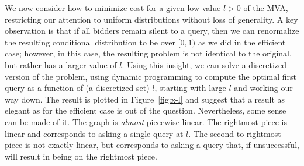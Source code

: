 We now consider how to minimize cost for a given low value $l>0$ of the
MVA, restricting our attention to uniform distributions without loss of
generality.  A key observation is that if all bidders remain silent to a
query, then we can renormalize the resulting conditional distribution to be
over $[0,1)$ as we did in the efficient case; however, in this case, the
resulting problem is not identical to the original, but rather has a larger
value of $l$.  Using this insight, we can solve a discretized version of
the problem, using dynamic programming to compute the optimal first query
as a function of (a discretized set) $l$, starting with large $l$ and
working our way down.
The result is plotted in Figure~\ref{fig:x-l} and suggest that a result as
elegant as for the efficient case is out of the question.  Nevertheless,
some sense can be made of it.  The graph is {\em almost} piecewise linear.
The rightmost piece is linear and corresponds to asking a single query at
$l$.  The second-to-rightmost piece is not exactly linear, but corresponds
to asking a query that, if unsuccessful, will result in being on the
rightmost piece.






